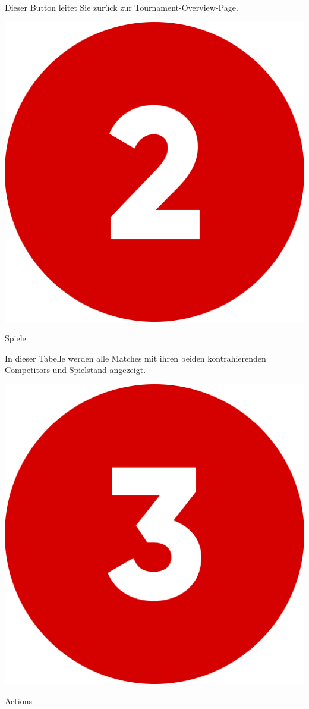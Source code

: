 Dieser Button leitet Sie zurück zur Tournament-Overview-Page.

\bigskip
\includegraphics[scale=0.05]{pics/user-guide/numbers/number-2.png} \begin{LARGE} Spiele \end{LARGE}

In dieser Tabelle werden alle Matches mit ihren beiden kontrahierenden Competitors und Spielstand angezeigt.  

\bigskip
\includegraphics[scale=0.05]{pics/user-guide/numbers/number-3.png} \begin{LARGE} Actions \end{LARGE}

